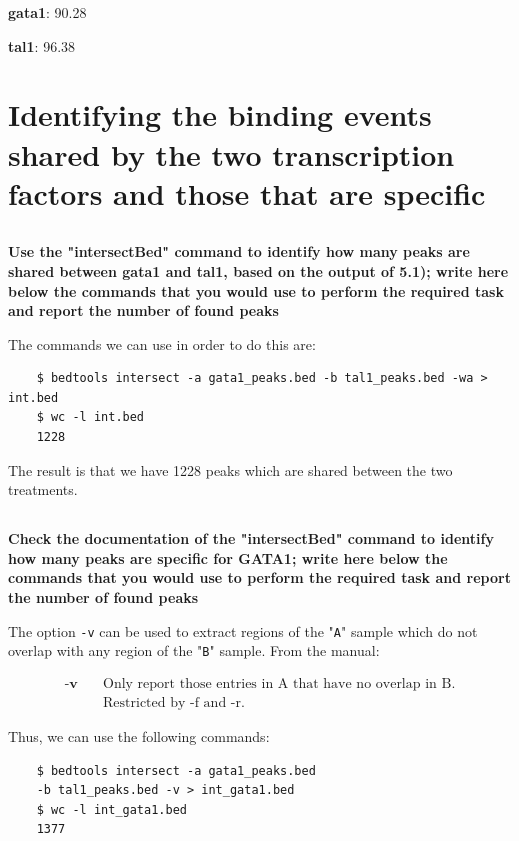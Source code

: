 \documentclass[12pt, a4paper]{article}
\begin{document}
	\textbf{gata1}: 90.28
	
	\textbf{tal1}: 96.38
	
	
	\section{Identifying the binding events shared by the two transcription factors and those that are specific}
	
	\subsection{}
	\textbf{Use the "intersectBed" command to identify how many peaks are shared between gata1 and tal1, based on the output of 5.1); write here below the commands that you would use to perform the required task and report the number of found peaks}
	
	The commands we can use in order to do this are:
	
	\begin{verbatim}
	$ bedtools intersect -a gata1_peaks.bed -b tal1_peaks.bed -wa > int.bed
	$ wc -l int.bed
	1228
	\end{verbatim}
	
	The result is that we have 1228 peaks which are shared between the two treatments.
	
	\subsection{}
	\textbf{Check the documentation of the "intersectBed" command to identify how many peaks are specific for GATA1; write here below the commands that you would use to perform the required task and report the number of found peaks}
	
	The option \verb|-v| can be used to extract regions of the "\verb|A|" sample which do not overlap with any region of the "\verb|B|" sample. From the manual:
	\begin{displayquote}
		\begin{align*}
			\textbf{-v} \quad & \text{Only report those entries in A that have no overlap in B.}\\
			& \text{Restricted by -f and -r.}
		\end{align*}
	\end{displayquote}
	
	Thus, we can use the following commands:
	
	\begin{verbatim}
	$ bedtools intersect -a gata1_peaks.bed
	-b tal1_peaks.bed -v > int_gata1.bed
	$ wc -l int_gata1.bed
	1377
	\end{verbatim}
	
\end{document}
